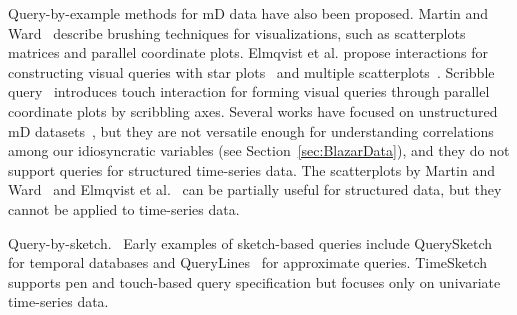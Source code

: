Query-by-example methods for mD data have also been proposed.
Martin and Ward~\cite{Martin2005} describe brushing techniques for visualizations,
such as scatterplots matrices and parallel coordinate plots.
Elmqvist et al. propose interactions for constructing visual queries with star plots~\cite{Elmqvist2007} and multiple scatterplots~\cite{Elmqvist2008}.
Scribble query~\cite{Nielsen2016} introduces touch interaction for forming visual queries
through parallel coordinate plots by scribbling axes. 
Several works have focused on unstructured mD datasets~\cite{Martin2005,Elmqvist2007,Nielsen2016}, 
but they are not versatile enough for understanding correlations among our idiosyncratic variables (see Section~\ref{sec:BlazarData}), and they do not support queries for structured time-series data.
The scatterplots by Martin and Ward~\cite{Martin2005} and Elmqvist et al.~\cite{Elmqvist2008} can be partially useful for structured data, but they cannot be applied to time-series data.

\textsf{Query-by-sketch.\ } 
Early examples of sketch-based queries include QuerySketch~\cite{Wattenberg2001} for temporal databases and QueryLines~\cite{Ryall2005} for approximate queries. 
TimeSketch~\cite{Eichmann2015} supports pen and touch-based query specification but focuses only on univariate time-series data.

